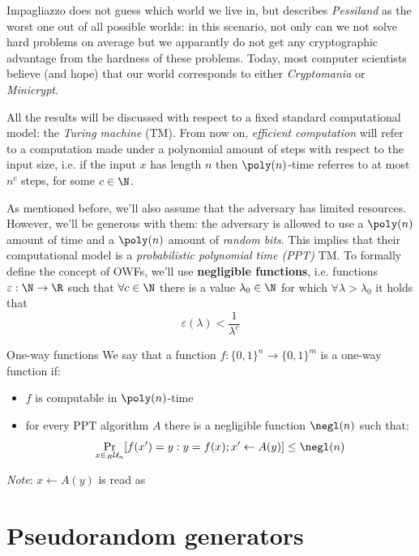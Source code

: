 \documentclass[a4paper, 12pt]{report}
\begin{document}
    Impagliazzo does not guess which world we live in, but describes \textit{Pessiland} as the worst one out of all possible worlds: in this scenario, not only can we not solve hard problems on average but we apparantly do not get any cryptographic advantage from the hardness of these problems. Today, most computer scientists believe (and hope) that our world corresponds to either \textit{Cryptomania} or \textit{Minicrypt}.

    All the results will be discussed with respect to a fixed standard computational model: the \textit{Turing machine} (TM). From now on, \textit{efficient computation} will refer to a computation made under a polynomial amount of steps with respect to the input size, i.e. if the input $x$ has length $n$ then $\poly(n)$-time referres to at most $n^{c}$ steps, for some $c \in \N$.
    
    As mentioned before, we'll also assume that the adversary has limited resources. However, we'll be generous with them: the adversary is allowed to use a $\poly(n)$ amount of time and a $\poly(n)$ amount of \textit{random bits}. This implies that their computational model is a \textit{probabilistic polynomial time (PPT)} TM. To formally define the concept of OWFs, we'll use \textbf{negligible functions}, i.e. functions $\varepsilon : \N \to \R$ such that $\forall c \in \N$ there is a value $\lambda_0 \in \N$ for which $\forall \lambda > \lambda_0$ it holds that
    \[\varepsilon(\lambda) < \frac{1}{\lambda^c}\]

    \begin{frameddefn}{One-way functions}
        We say that a function $f : \{0,1\}^n \to \{0,1\}^m$ is a one-way function if:
        \begin{itemize}
            \item $f$ is computable in $\poly(n)$-time
            \item for every PPT algorithm $A$ there is a negligible function $\negl(n)$ such that:
            \[\Pr_{x \in_R \mathcal{U}_n}[f(x') = y : y = f(x); x' \gets A(y)] \leq \negl(n)\]
        \end{itemize}

        \textit{Note}: $x \gets A(y)$ is read as 
    \end{frameddefn}

    \section{Pseudorandom generators}
\end{document}
